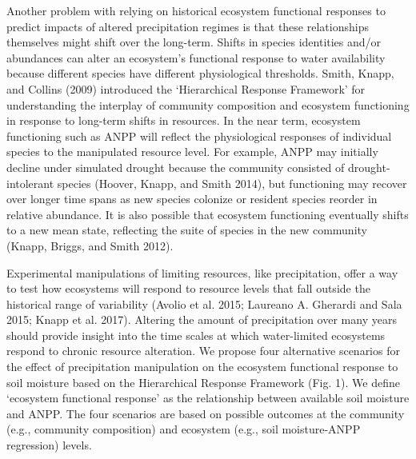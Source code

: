 \documentclass[fleqn,10pt,lineno]{wlpeerj} %
\begin{document}
Another problem with relying on historical ecosystem functional
responses to predict impacts of altered precipitation regimes is that
these relationships themselves might shift over the long-term. Shifts in
species identities and/or abundances can alter an ecosystem's functional
response to water availability because different species have different
physiological thresholds. Smith, Knapp, and Collins (2009) introduced
the `Hierarchical Response Framework' for understanding the interplay of
community composition and ecosystem functioning in response to long-term
shifts in resources. In the near term, ecosystem functioning such as
ANPP will reflect the physiological responses of individual species to
the manipulated resource level. For example, ANPP may initially decline
under simulated drought because the community consisted of
drought-intolerant species (Hoover, Knapp, and Smith 2014), but
functioning may recover over longer time spans as new species colonize
or resident species reorder in relative abundance. It is also possible
that ecosystem functioning eventually shifts to a new mean state,
reflecting the suite of species in the new community (Knapp, Briggs, and
Smith 2012).

Experimental manipulations of limiting resources, like precipitation,
offer a way to test how ecosystems will respond to resource levels that
fall outside the historical range of variability (Avolio et al. 2015;
Laureano A. Gherardi and Sala 2015; Knapp et al. 2017). Altering the
amount of precipitation over many years should provide insight into the
time scales at which water-limited ecosystems respond to chronic
resource alteration. We propose four alternative scenarios for the
effect of precipitation manipulation on the ecosystem functional
response to soil moisture based on the Hierarchical Response Framework
(Fig. 1). We define `ecosystem functional response' as the relationship
between available soil moisture and ANPP. The four scenarios are based
on possible outcomes at the community (e.g., community composition) and
ecosystem (e.g., soil moisture-ANPP regression) levels.
\end{document}
